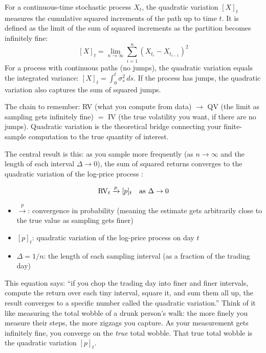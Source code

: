 \begin{prereq}
For a continuous-time stochastic process $X_t$, the quadratic variation $[X]_t$ measures the cumulative squared increments of the path up to time $t$.
It is defined as the limit of the sum of squared increments as the partition becomes infinitely fine:
\[
  [X]_t = \lim_{n \to \infty} \sum_{i=1}^{n} (X_{t_i} - X_{t_{i-1}})^2
\]
For a process with continuous paths (no jumps), the quadratic variation equals the integrated variance: $[X]_t = \int_0^t \sigma^2_s\,ds$.
If the process has jumps, the quadratic variation also captures the sum of squared jumps.

The chain to remember: RV (what you compute from data) $\to$ QV (the limit as sampling gets infinitely fine) $=$ IV (the true volatility you want, if there are no jumps).
Quadratic variation is the theoretical bridge connecting your finite-sample computation to the true quantity of interest.
\end{prereq}

The central result is this: as you sample more frequently (as $n \to \infty$ and the length of each interval $\Delta \to 0$), the sum of squared returns converges to the quadratic variation of the log-price process \citep{ABDL2001, BNS2002}:

\begin{equation}
  \operatorname{RV}_t \xrightarrow{p} [p]_t \quad \text{as } \Delta \to 0
  \label{eq:rv-convergence}
\end{equation}
\begin{itemize}[nosep]
  \item $\xrightarrow{p}$: convergence in probability (meaning the estimate gets arbitrarily close to the true value as sampling gets finer)
  \item $[p]_t$: quadratic variation of the log-price process on day $t$
  \item $\Delta = 1/n$: the length of each sampling interval (as a fraction of the trading day)
\end{itemize}

\begin{intuition}
This equation says: ``if you chop the trading day into finer and finer intervals, compute the return over each tiny interval, square it, and sum them all up, the result converges to a specific number called the quadratic variation.''
Think of it like measuring the total wobble of a drunk person's walk: the more finely you measure their steps, the more zigzags you capture.
As your measurement gets infinitely fine, you converge on the \emph{true} total wobble.
That true total wobble is the quadratic variation $[p]_t$.
\end{intuition}

